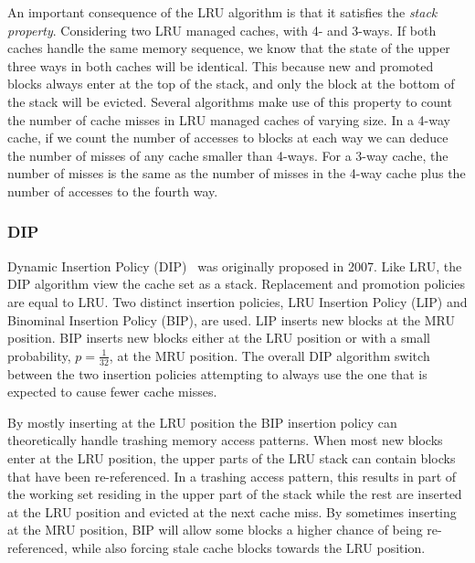 An important consequence of the LRU algorithm is that it satisfies the \textit{stack property}.
Considering two LRU managed caches, with 4- and 3-ways.
If both caches handle the same memory sequence, we know that the state of the upper three ways in both caches will be identical.
This because new and promoted blocks always enter at the top of the stack, and only the block at the bottom of the stack will be evicted.
Several algorithms make use of this property to count the number of cache misses in LRU managed caches of varying size.
In a 4-way cache, if we count the number of accesses to blocks at each way we can deduce the number of misses of any cache smaller than 4-ways. 
For a 3-way cache, the number of misses is the same as the number of misses in the 4-way cache plus the number of accesses to the fourth way.

\subsubsection{DIP}

Dynamic Insertion Policy (DIP)~\cite{Qureshi2007} was originally proposed in 2007.
Like LRU, the DIP algorithm view the cache set as a stack.
Replacement and promotion policies are equal to LRU.
Two distinct insertion policies, LRU Insertion Policy (LIP) and Binominal Insertion Policy (BIP), are used.
LIP inserts new blocks at the MRU position.
BIP inserts new blocks either at the LRU position or with a small probability, $p = \frac{1}{32}$, at the MRU position. 
The overall DIP algorithm switch between the two insertion policies attempting to always use the one that is expected to cause fewer cache misses.

By mostly inserting at the LRU position the BIP insertion policy can theoretically handle trashing memory access patterns.
When most new blocks enter at the LRU position, the upper parts of the LRU stack can contain blocks that have been re-referenced.
In a trashing access pattern, this results in part of the working set residing in the upper part of the stack while the rest are inserted at the LRU position and evicted at the next cache miss.
By sometimes inserting at the MRU position, BIP will allow some blocks a higher chance of being re-referenced, while also forcing stale cache blocks towards the LRU position. 

